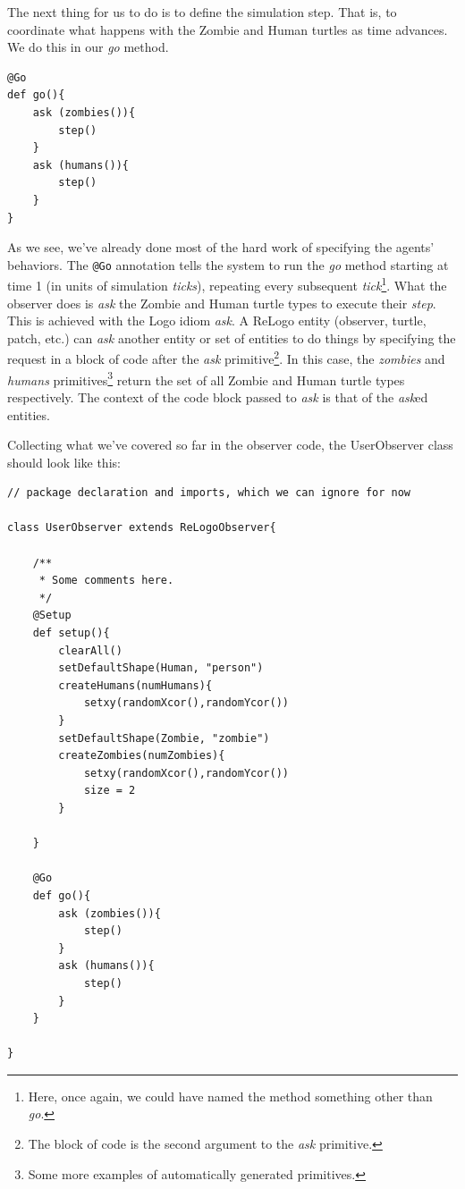 \documentclass[11pt]{amsart}
\begin{document}
The next thing for us to do is to define the simulation step. That is, to coordinate what happens with the Zombie and Human turtles as time advances. We do this in our \emph{go} method.

\noindent\begin{minipage}[h]{\textwidth}
\vspace{.2in}
\lstset{language=java,caption=The UserObserver go method.,label=lst:observergo}
\begin{lstlisting}
@Go
def go(){
	ask (zombies()){
		step()
	}
	ask (humans()){
		step()
	}
}
\end{lstlisting}
\vspace{.2in}
\end{minipage}
As we see, we've already done most of the hard work of specifying the agents' behaviors. The \texttt{@Go} annotation tells the system to run the \emph{go} method starting at time 1 (in units of simulation \emph{ticks}), repeating every subsequent \emph{tick}\footnote{Here, once again, we could have named the method something other than \emph{go}.}. What the observer does is \emph{ask} the Zombie and Human turtle types to execute their \emph{step}. This is achieved with the Logo idiom \emph{ask}. A ReLogo entity (observer, turtle, patch, etc.) can \emph{ask} another entity or set of entities to do things by specifying the request in a block of code after the \emph{ask} primitive\footnote{The block of code is the second argument to the \emph{ask} primitive.}. In this case, the \emph{zombies} and \emph{humans} primitives\footnote{Some more examples of automatically generated primitives.} return the set of all Zombie and Human turtle types respectively. The context of the code block passed to \emph{ask} is that of the \emph{ask}ed entities.

Collecting what we've covered so far in the observer code, the UserObserver class should look like this:

\noindent\begin{minipage}[h]{\textwidth}
\vspace{.2in}
\lstset{language=java,caption=The UserObserver class.,label=lst:observer}
\begin{lstlisting}
// package declaration and imports, which we can ignore for now

class UserObserver extends ReLogoObserver{

	/**
	 * Some comments here.
	 */
	@Setup
	def setup(){
		clearAll()
		setDefaultShape(Human, "person")
		createHumans(numHumans){
			setxy(randomXcor(),randomYcor())
		}
		setDefaultShape(Zombie, "zombie")
		createZombies(numZombies){
			setxy(randomXcor(),randomYcor())
			size = 2
		}
		
	}
	
	@Go
	def go(){
		ask (zombies()){
			step()
		}
		ask (humans()){
			step()
		}
	}
	
}
\end{lstlisting}
\vspace{.2in}
\end{minipage}
\end{document}
